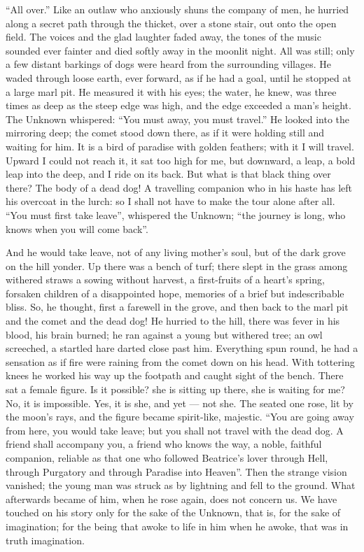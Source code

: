 \documentclass[12pt,a4paper,openany]{book}
\newcommand{\opage}[1]{\marginnote{\footnotesize\textit{[#1]}}}
\begin{document}
``All over.'' Like an outlaw who anxiously shuns the company of men, he hurried along a secret path through the
thicket, over a stone stair, out onto the open field. The voices and the glad laughter faded away, the tones of the
music sounded ever fainter and died softly away in the moonlit night. All was still; only a few distant barkings of
dogs were heard from the surrounding villages. He waded through loose earth, ever forward, as if he had a goal, until
he stopped at a large marl pit. He measured it with his eyes; the water, he knew, was three times as deep as the steep
edge was high, and the edge exceeded a man's height. The Unknown whispered: ``You must away, you must travel.'' He
looked into the mirroring deep; the comet stood down there, as if it were holding still and waiting for him. It is a
bird of paradise with golden feathers; with it I will travel. Upward I could not reach it, it sat too high for me, but
downward, a leap, a bold leap into the deep, and I ride on its back. But what is that black thing over there? The body
of a dead
\setcounter{footnote}{0}%
\opage{5}dog! A travelling companion who in his haste has left his overcoat in the lurch: so I shall not have to make
the tour alone after all. ``You must first take leave'', whispered the Unknown; ``the journey is long, who knows when
you will come back''.

And he would take leave, not of any living mother's soul, but of the dark grove on the hill yonder. Up there was a
bench of turf; there slept in the grass among withered straws a sowing without harvest, a first-fruits of a heart's
spring, forsaken children of a disappointed hope, memories of a brief but indescribable bliss. So, he thought, first a
farewell in the grove, and then back to the marl pit and the comet and the dead dog! He hurried to the hill, there was
fever in his blood, his brain burned; he ran against a young but withered tree; an owl screeched, a startled hare darted
close past him. Everything spun round, he had a sensation as if fire were raining from the comet down on his head. With
tottering knees he worked his way up the footpath and caught sight of the bench. There sat a female figure. Is it
possible? she is sitting up there, she is waiting for me? No, it is impossible. Yes, it is she, and yet --- not she.
The seated one rose, lit by the moon's rays, and the figure became spirit-like, majestic. ``You are going away from
here, you would take leave; but you shall not travel with the dead dog. A friend shall accompany you, a friend who
knows the way, a noble, faithful companion, reliable as that one who followed Beatrice's lover through Hell, through
Purgatory and through Paradise into Heaven''. Then the strange vision vanished; the young man was struck as by
lightning and fell to the ground. What afterwards
\setcounter{footnote}{0}%
\opage{6}became of him, when he rose again, does not concern us. We have touched on his story only for the sake of the
Unknown, that is, for the sake of imagination; for the being that awoke to life in him when he awoke, that was in truth
imagination.
\end{document}
